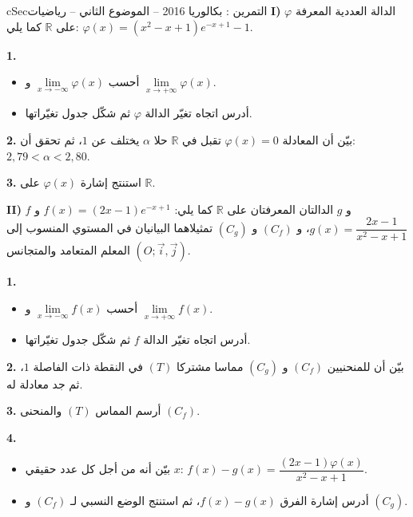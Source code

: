 \documentclass[12pt,a4paper]{article}
\newenvironment{BOX}[2]{\begin{otherlanguage}{english}\begin{arbox}{#1}{#2}}{\end{arbox}\end{otherlanguage}}
\newcounter{exo}
\newenvironment{tamrin}[1]{\stepcounter{exo}\begin{BOX}{cSec}{التمرين \theexo: #1}}{\end{BOX}}
\newcommand{\R}{\mathbb{R}}
\newenvironment{sq}{\begin{itemize}[leftmargin=2.4em,itemsep=3pt]}{\end{itemize}}
\newcommand{\qa}{\item[(أ)]}\newcommand{\qb}{\item[(ب)]}\newcommand{\qc}{\item[(جـ)]}\newcommand{\qd}{\item[(د)]}\newcommand{\qe}{\item[(هـ)]}
\newcommand{\QQ}[1]{\par\smallskip\textbf{#1.} }
\begin{document}
\begin{tamrin}{بكالوريا 2016 -- الموضوع الثاني -- رياضيات}
\textbf{I)} $\varphi$ الدالة العددية المعرفة على $\R$ كما يلي: $\varphi(x)=(x^2-x+1)e^{-x+1}-1$.
\QQ{1}
\begin{sq}
\qa أحسب $\lim\limits_{x\to-\infty}\varphi(x)$ و $\lim\limits_{x\to+\infty}\varphi(x)$.
\qb أدرس اتجاه تغيّر الدالة $\varphi$ ثم شكّل جدول تغيّراتها.
\end{sq}
\QQ{2} بيّن أن المعادلة $\varphi(x)=0$ تقبل في $\R$ حلا $\alpha$ يختلف عن $1$، ثم تحقق أن: $2{,}79<\alpha<2{,}80$.
\QQ{3} استنتج إشارة $\varphi(x)$ على $\R$.

\textbf{II)} $f$ و $g$ الدالتان المعرفتان على $\R$ كما يلي: $f(x)=(2x-1)e^{-x+1}$ و $g(x)=\dfrac{2x-1}{x^2-x+1}$،
و $(C_f)$ و $(C_g)$ تمثيلاهما البيانيان في المستوي المنسوب إلى المعلم المتعامد والمتجانس $(O;\vec i,\vec j)$.
\QQ{1}
\begin{sq}
\qa أحسب $\lim\limits_{x\to-\infty}f(x)$ و $\lim\limits_{x\to+\infty}f(x)$.
\qb أدرس اتجاه تغيّر الدالة $f$ ثم شكّل جدول تغيّراتها.
\end{sq}
\QQ{2} بيّن أن للمنحنيين $(C_f)$ و $(C_g)$ مماسا مشتركا $(T)$ في النقطة ذات الفاصلة $1$، ثم جد معادلة له.
\QQ{3} أرسم المماس $(T)$ والمنحنى $(C_f)$.
\QQ{4}
\begin{sq}
\qa بيّن أنه من أجل كل عدد حقيقي $x$: $f(x)-g(x)=\dfrac{(2x-1)\varphi(x)}{x^2-x+1}$.
\qb أدرس إشارة الفرق $f(x)-g(x)$، ثم استنتج الوضع النسبي لـ $(C_f)$ و $(C_g)$.
\end{sq}
\end{tamrin}
\end{document}
